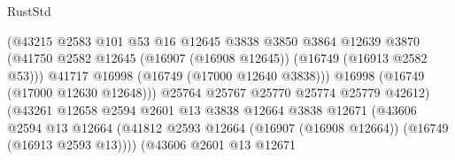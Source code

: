 \begin{lexlean}{RustStd}
\begin{coremodule}
                                            (@43215
                                              @2583
                                              @101
                                              @53
                                              @16
                                              @12645
                                              @3838
                                              @3850
                                              @3864
                                              @12639
                                              @3870
                                              (@41750
                                                @2582
                                                @12645
                                                (@16907 (@16908 @12645))
                                                (@16749 (@16913 @2582 @53)))
                                              @41717
                                              @16998
                                              (@16749 (@17000 @12640 @3838)))
                                            @16998
                                            (@16749 (@17000 @12630 @12648)))
                                          @25764
                                          @25767
                                          @25770
                                          @25774
                                          @25779
                                          @42612)
                                        (@43261
                                          @12658
                                          @2594
                                          @2601
                                          @13
                                          @3838
                                          @12664
                                          @3838
                                          @12671
                                          (@43606
                                            @2594
                                            @13
                                            @12664
                                            (@41812
                                              @2593
                                              @12664
                                              (@16907 (@16908 @12664))
                                              (@16749 (@16913 @2593 @13))))
                                          (@43606
                                            @2601
                                            @13
                                            @12671

\end{coremodule}
\end{lexlean}
